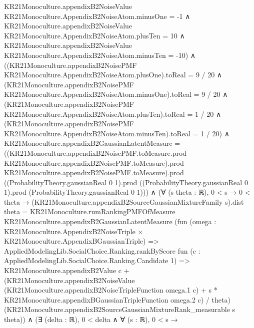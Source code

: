 \documentclass[10pt]{article}
\begin{document}
\begin{ReviewVerbatim}
                KR21Monoculture.appendixB2NoiseValue KR21Monoculture.AppendixB2NoiseAtom.minusOne = -1 ∧
                  KR21Monoculture.appendixB2NoiseValue KR21Monoculture.AppendixB2NoiseAtom.plusTen = 10 ∧
                    KR21Monoculture.appendixB2NoiseValue KR21Monoculture.AppendixB2NoiseAtom.minusTen = -10) ∧
              ((KR21Monoculture.appendixB2NoisePMF KR21Monoculture.AppendixB2NoiseAtom.plusOne).toReal = 9 / 20 ∧
                  (KR21Monoculture.appendixB2NoisePMF KR21Monoculture.AppendixB2NoiseAtom.minusOne).toReal = 9 / 20 ∧
                    (KR21Monoculture.appendixB2NoisePMF KR21Monoculture.AppendixB2NoiseAtom.plusTen).toReal = 1 / 20 ∧
                      (KR21Monoculture.appendixB2NoisePMF KR21Monoculture.AppendixB2NoiseAtom.minusTen).toReal =
                        1 / 20) ∧
                KR21Monoculture.appendixB2GaussianLatentMeasure =
                    ((KR21Monoculture.appendixB2NoisePMF.toMeasure.prod
                              KR21Monoculture.appendixB2NoisePMF.toMeasure).prod
                          KR21Monoculture.appendixB2NoisePMF.toMeasure).prod
                      ((ProbabilityTheory.gaussianReal 0 1).prod
                        ((ProbabilityTheory.gaussianReal 0 1).prod (ProbabilityTheory.gaussianReal 0 1))) ∧
                  (∀ (s theta : ℝ),
                      0 < s →
                        0 < theta →
                          (KR21Monoculture.appendixB2SourceGaussianMixtureFamily s).dist theta =
                            KR21Monoculture.rumRankingPMFOfMeasure KR21Monoculture.appendixB2GaussianLatentMeasure
                              (fun
                                  (omega :
                                    KR21Monoculture.AppendixB2NoiseTriple × KR21Monoculture.AppendixBGaussianTriple) =>
                                AppliedModelingLib.SocialChoice.Ranking.rankByScore
                                  fun (c : AppliedModelingLib.SocialChoice.Ranking.Candidate 1) =>
                                  KR21Monoculture.appendixB2Value c +
                                    (KR21Monoculture.appendixB2NoiseValue
                                          (KR21Monoculture.appendixB2NoiseTripleFunction omega.1 c) +
                                        s * KR21Monoculture.appendixBGaussianTripleFunction omega.2 c) /
                                      theta)
                              (KR21Monoculture.appendixB2SourceGaussianMixtureRank_measurable s theta)) ∧
                    (∃ (delta : ℝ),
                        0 < delta ∧
                          ∀ (s : ℝ),
                            0 < s →

\end{ReviewVerbatim}
\end{document}
